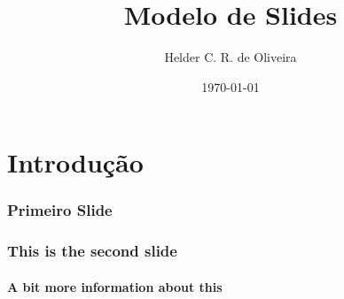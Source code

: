 \documentclass{beamer}
\begin{document}
\title{Modelo de Slides}

\author[Helder]{Helder C. R. de Oliveira}



\date{\today}

\begin{frame}
	\titlepage
\end{frame}

\begin{frame}
	\tableofcontents
\end{frame}

\section{Introdução}
\begin{frame}
	\frametitle{Primeiro Slide}
\end{frame}

\begin{frame}
	\frametitle{This is the second slide}
	\framesubtitle{A bit more information about this}
\end{frame}
\end{document}
